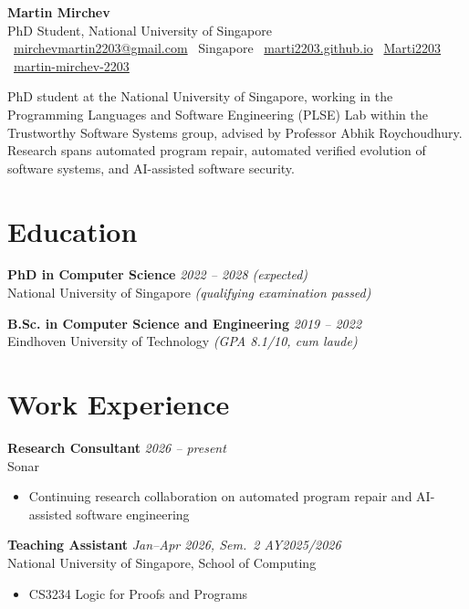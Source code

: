 \documentclass[10pt,a4paper]{article}
\newcommand{\entry}[2]{%
  \noindent\textbf{#1} \hfill \textit{#2}\\[0.1em]
}
\begin{document}
\begin{center}
  {\Huge\bfseries Martin Mirchev}\\[0.4em]
  PhD Student, National University of Singapore\\[0.3em]
  \faEnvelope\ \href{mailto:mirchevmartin2203@gmail.com}{mirchevmartin2203@gmail.com}
  \quad\textbar\quad
  \faMapMarker*\ Singapore
  \quad\textbar\quad
  \faGlobe\ \href{https://marti2203.github.io}{marti2203.github.io}
  \quad\textbar\quad
  \faGithub\ \href{https://github.com/Marti2203}{Marti2203}
  \quad\textbar\quad
  \faLinkedin\ \href{https://www.linkedin.com/in/martin-mirchev-2203}{martin-mirchev-2203}
\end{center}

\vspace{0.3em}

PhD student at the National University of Singapore, working in the Programming Languages and Software Engineering (PLSE) Lab within the Trustworthy Software Systems group, advised by Professor Abhik Roychoudhury. Research spans automated program repair, automated verified evolution of software systems, and AI-assisted software security.

\section*{Education}
\entry{PhD in Computer Science}{2022 -- 2028 (expected)}
National University of Singapore \textit{(qualifying examination passed)}

\vspace{0.4em}
\entry{B.Sc. in Computer Science and Engineering}{2019 -- 2022}
Eindhoven University of Technology \textit{(GPA 8.1/10, cum laude)}

\section*{Work Experience}

\entry{Research Consultant}{2026 -- present}
Sonar
\begin{itemize}
  \item Continuing research collaboration on automated program repair and AI-assisted software engineering
\end{itemize}

\vspace{0.3em}
\entry{Teaching Assistant}{Jan--Apr 2026, Sem.\ 2 AY2025/2026}
National University of Singapore, School of Computing
\begin{itemize}
  \item CS3234 Logic for Proofs and Programs
\end{itemize}
\end{document}
